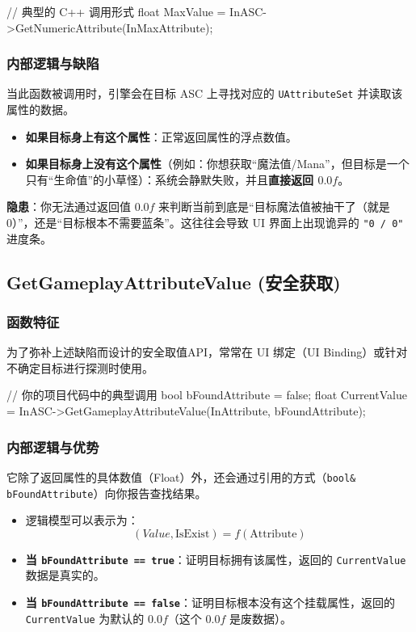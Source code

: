 \begin{code}
	// 典型的 C++ 调用形式
	float MaxValue = InASC->GetNumericAttribute(InMaxAttribute);
\end{code}

\subsubsection{内部逻辑与缺陷}
当此函数被调用时，引擎会在目标 ASC 上寻找对应的 \texttt{UAttributeSet} 并读取该属性的数据。
\begin{itemize}
	\item \textbf{如果目标身上有这个属性}：正常返回属性的浮点数值。
	\item \textbf{如果目标身上没有这个属性}（例如：你想获取“魔法值/Mana”，但目标是一个只有“生命值”的小草怪）：系统会静默失败，并且\textbf{直接返回 $0.0f$}。
\end{itemize}

\textbf{隐患}：你无法通过返回值 $0.0f$ 来判断当前到底是“目标魔法值被抽干了（就是 0）”，还是“目标根本不需要蓝条”。这往往会导致 UI 界面上出现诡异的 \texttt{"0 / 0"} 进度条。

\subsection{GetGameplayAttributeValue (安全获取)}

\subsubsection{函数特征}
为了弥补上述缺陷而设计的安全取值API，常常在 UI 绑定（UI Binding）或针对不确定目标进行探测时使用。

\begin{code}
	// 你的项目代码中的典型调用
	bool bFoundAttribute = false;
	float CurrentValue = InASC->GetGameplayAttributeValue(InAttribute, bFoundAttribute);
\end{code}

\subsubsection{内部逻辑与优势}
它除了返回属性的具体数值（Float）外，还会通过引用的方式（\texttt{bool\& bFoundAttribute}）向你报告查找结果。

\begin{itemize}
	\item 逻辑模型可以表示为：
	\begin{equation}
		(Value, \text{IsExist}) = f(\text{Attribute})
	\end{equation}
	\item \textbf{当 \texttt{bFoundAttribute == true}}：证明目标拥有该属性，返回的 \texttt{CurrentValue} 数据是真实的。
	\item \textbf{当 \texttt{bFoundAttribute == false}}：证明目标根本没有这个挂载属性，返回的 \texttt{CurrentValue} 为默认的 $0.0f$（这个 $0.0f$ 是废数据）。
\end{itemize}

